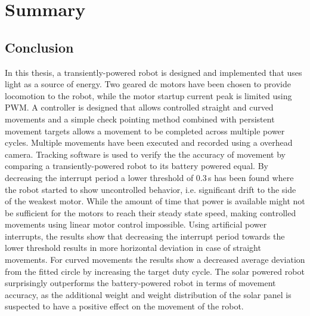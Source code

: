 \chapter{Summary}
\label{chp:summary}


\section{Conclusion}
\label{sec:conclusion}

In this thesis, a transiently-powered robot is designed and implemented that uses light as a source of energy.
Two geared dc motors have been chosen to provide locomotion to the robot, while the motor startup current peak is limited using PWM.
A controller is designed that allows controlled straight and curved movements and a simple check pointing method combined with persistent movement targets allows a movement to be completed across multiple power cycles.
Multiple movements have been executed and recorded using a overhead camera.
Tracking software is used to verify the the accuracy of movement by comparing a transiently-powered robot to its battery powered equal.
By decreasing the interrupt period a lower threshold of 0.3\,s has been found where the robot started to show uncontrolled behavior, i.e. significant drift to the side of the weakest motor.
While the amount of time that power is available might not be sufficient for the motors to reach their steady state speed, making controlled movements using linear motor control impossible.
Using artificial power interrupts, the results show that decreasing the interrupt period towards the lower threshold results in more horizontal deviation in case of straight movements.
For curved movements the results show a decreased average deviation from the fitted circle by increasing the target duty cycle.
The solar powered robot surprisingly outperforms the battery-powered robot in terms of movement accuracy, as the additional weight and weight distribution of the solar panel is suspected to have a positive effect on the movement of the robot.


